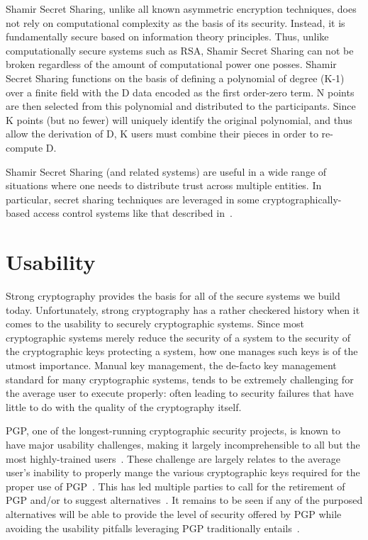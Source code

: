 Shamir Secret Sharing, unlike all known asymmetric encryption
techniques, does not rely on computational complexity as the basis of
its security. Instead, it is fundamentally secure based on information
theory principles. Thus, unlike computationally secure systems such as
RSA, Shamir Secret Sharing can not be broken regardless of the amount
of computational power one posses. Shamir Secret Sharing functions on
the basis of defining a polynomial of degree (K-1) over a finite field
with the D data encoded as the first order-zero term. N points are
then selected from this polynomial and distributed to the
participants. Since K points (but no fewer) will uniquely identify the
original polynomial, and thus allow the derivation of D, K users must
combine their pieces in order to re-compute D.

Shamir Secret Sharing (and related systems) are useful in a wide range
of situations where one needs to distribute trust across multiple
entities. In particular, secret sharing techniques are leveraged in
some cryptographically-based access control systems like that
described in~\cite{Goyal2006}.

\section{Usability}
\label{chap:background:usability}

Strong cryptography provides the basis for all of the secure systems
we build today. Unfortunately, strong cryptography has a rather
checkered history when it comes to the usability to securely
cryptographic systems. Since most cryptographic systems merely reduce
the security of a system to the security of the cryptographic keys
protecting a system, how one manages such keys is of the utmost
importance. Manual key management, the de-facto key management
standard for many cryptographic systems, tends to be extremely
challenging for the average user to execute properly: often leading to
security failures that have little to do with the quality of the
cryptography itself.

PGP, one of the longest-running cryptographic security projects, is
known to have major usability challenges, making it largely
incomprehensible to all but the most highly-trained
users~\cite{Whitten1999}. These challenge are largely relates to the
average user's inability to properly mange the various cryptographic
keys required for the proper use of PGP~\cite{green-challenge}. This
has led multiple parties to call for the retirement of PGP and/or to
suggest alternatives~\cite{mailpile, openwhisper, google-endtoend}. It
remains to be seen if any of the purposed alternatives will be able to
provide the level of security offered by PGP while avoiding the
usability pitfalls leveraging PGP traditionally
entails~\cite{green-pgp}.

